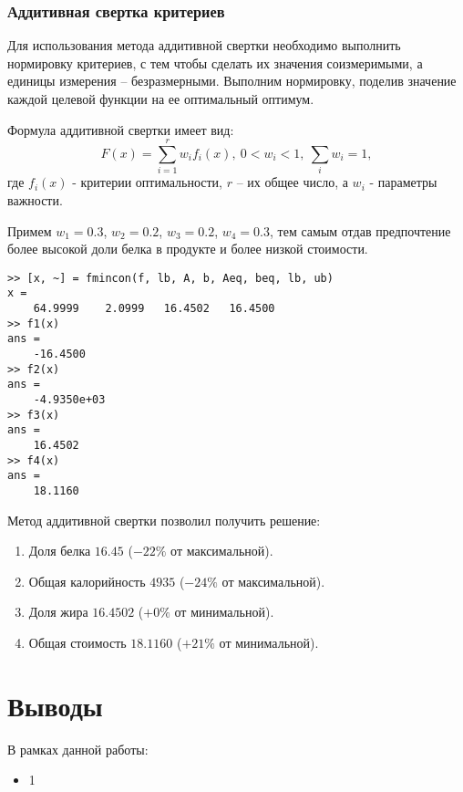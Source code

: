 \subsubsection{Аддитивная свертка критериев}

Для использования метода аддитивной свертки необходимо выполнить нормировку критериев, с тем чтобы сделать их значения соизмеримыми, а единицы измерения – безразмерными. Выполним нормировку, поделив значение каждой целевой функции на ее оптимальный оптимум.

Формула аддитивной свертки имеет вид:
$$
F(x) = \sum_{i=1}^{r}w_i f_i(x),\ 0<w_i<1,\ \sum_i w_i=1,
$$
где $f_i(x)$ - критерии оптимальности, $r$ – их общее число, а $w_i$ - параметры важности. 

Примем $w_1 = 0.3$, $w_2 = 0.2$, $w_3 = 0.2$, $w_4 = 0.3$, тем самым отдав предпочтение более высокой доли белка в продукте и более низкой стоимости.



\begin{lstlisting}[caption=\code{console.m}]
>> [x, ~] = fmincon(f, lb, A, b, Aeq, beq, lb, ub)
x = 
	64.9999    2.0999   16.4502   16.4500
>> f1(x)
ans =
	-16.4500
>> f2(x)
ans =
	-4.9350e+03
>> f3(x)
ans =
	16.4502
>> f4(x)
ans =
	18.1160

\end{lstlisting}

Метод аддитивной свертки позволил получить решение:

\begin{enumerate}
	\item Доля белка $16.45$ ($-22\%$ от максимальной).
	\item Общая калорийность $4935$ ($-24\%$ от максимальной).
	\item Доля жира $16.4502$ ($+0\%$ от минимальной).
	\item Общая стоимость $18.1160$ ($+21\%$ от минимальной).
\end{enumerate}

\section{Выводы}

В рамках данной работы:

\begin{itemize}
	\item 1
\end{itemize}


